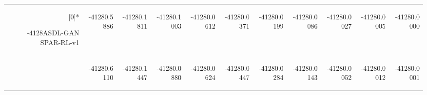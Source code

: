 \begin{table}[htbp]
\begin{tabular}{rrrrrrrrrrr}
    \rowcolor[rgb]{ 0,  0,  0} \multirow{2}[0]{*}{\begin{turn}{-4128}ASDL-GAN SPAR-RL-v1\end{turn}} & \begin{turn}{-4128}0.5886 \end{turn} & \begin{turn}{-4128}0.1811 \end{turn} & \begin{turn}{-4128}0.1003 \end{turn} & \begin{turn}{-4128}0.0612 \end{turn} & \begin{turn}{-4128}0.0371 \end{turn} & \begin{turn}{-4128}0.0199 \end{turn} & \begin{turn}{-4128}0.0086 \end{turn} & \begin{turn}{-4128}0.0027 \end{turn} & \begin{turn}{-4128}0.0005 \end{turn} & \begin{turn}{-4128}0.0000 \end{turn} \\
    \rowcolor[rgb]{ 0,  0,  0}       & \begin{turn}{-4128}0.6110 \end{turn} & \begin{turn}{-4128}0.1447 \end{turn} & \begin{turn}{-4128}0.0880 \end{turn} & \begin{turn}{-4128}0.0624 \end{turn} & \begin{turn}{-4128}0.0447 \end{turn} & \begin{turn}{-4128}0.0284 \end{turn} & \begin{turn}{-4128}0.0143 \end{turn} & \begin{turn}{-4128}0.0052 \end{turn} & \begin{turn}{-4128}0.0012 \end{turn} & \begin{turn}{-4128}0.0001 \end{turn} \\

\end{tabular}
\end{table}
